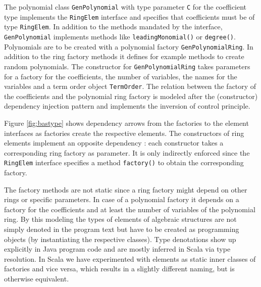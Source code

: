 \documentclass{llncs}
\newcommand{\code}[1]{\texttt{#1}}
\begin{document}

The polynomial class \code{Gen\-Polynomial} with type parameter
\code{C} for the coefficient type implements the \code{Ring\-Elem}
interface and specifies that coefficients must be of type
\code{Ring\-Elem}.  In addition to the methods mandated by the
interface, \code{Gen\-Polynomial} implements methods like
\code{leading\-Monomial()} or \code{degree()}.  Polynomials are to be
created with a polynomial factory \code{Gen\-Polynomial\-Ring}. In
addition to the ring factory methods it defines for example methods
to create random polynomials.  The constructor for
\code{Gen\-Polynomial\-Ring} takes parameters for a factory for the
coefficients, the number of variables, the names for the variables and
a term order object \code{Term\-Order}. The relation between the
factory of the coefficients and the polynomial ring factory is modeled
after the (constructor) dependency injection pattern and implements the
inversion of control principle.

Figure \ref{fig:bastype} shows dependency arrows from the factories to
the element interfaces as factories create the respective elements.
The constructors of ring elements implement an opposite
dependency : each constructor takes a corresponding ring
factory as parameter.  It is only indirectly enforced since the
\code{RingElem} interface specifies a method \code{factory()} to
obtain the corresponding factory.

The factory methods are not static 
since a ring factory might depend on other rings or specific
parameters. In case of a polynomial factory it depends on a factory
for the coefficients and at least the number of variables of the
polynomial ring. By this modeling the types of elements of algebraic
structures are not simply denoted in the program text but have to be
created as programming objects (by instantiating the respective
classes). Type denotations show up explicitly in Java program code and
are mostly inferred in Scala via type resolution. In Scala we have
experimented with elements as static inner classes of factories
and vice versa, which results in a slightly different naming, but is
otherwise equivalent.
\end{document}
